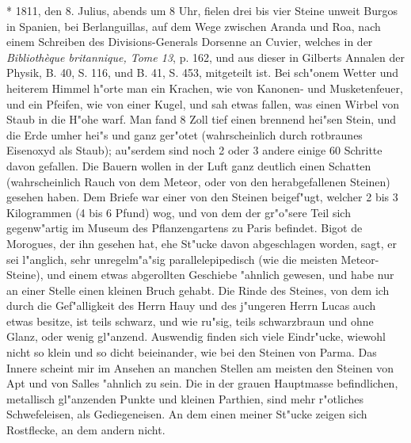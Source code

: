 \documentclass[a4paper, 11pt, oneside, polutonikogreek, german]{article}
\begin{document}
* 1811, den 8. Julius, abends um 8 Uhr, fielen drei bis vier Steine unweit Burgos in Spanien, bei Berlanguillas, auf dem Wege zwischen Aranda und Roa, nach einem Schreiben des Divisions-Generals Dorsenne an Cuvier, welches in der \emph{Bibliothèque britannique, Tome 13}, p. 162, und aus dieser in Gilberts Annalen der Physik, B. 40, S. 116, und B. 41, S. 453, mitgeteilt ist. Bei sch"onem Wetter und heiterem Himmel h"orte man ein Krachen, wie von Kanonen- und Musketenfeuer, und ein Pfeifen, wie von einer Kugel, und sah etwas fallen, was einen Wirbel von Staub in die H"ohe warf. Man fand 8 Zoll tief einen brennend hei"sen Stein, und die Erde umher hei"s und ganz ger"otet (wahrscheinlich durch rotbraunes Eisenoxyd als Staub); au"serdem sind noch 2 oder 3 andere einige 60 Schritte davon gefallen. Die Bauern wollen in der Luft ganz deutlich einen Schatten (wahrscheinlich Rauch von dem Meteor, oder von den herabgefallenen Steinen) gesehen haben. Dem Briefe war einer von den Steinen beigef"ugt, welcher 2 bis 3 Kilogrammen (4 bis 6 Pfund) wog, und von dem der gr"o"sere Teil sich gegenw"artig im Museum des Pflanzengartens zu Paris befindet. Bigot de Morogues, der ihn gesehen hat, ehe St"ucke davon abgeschlagen worden, sagt, er sei l"anglich, sehr unregelm"a"sig parallelepipedisch (wie die meisten Meteor-Steine), und einem etwas abgerollten Geschiebe "ahnlich gewesen, und habe nur an einer Stelle einen kleinen Bruch gehabt. Die Rinde des Steines, von dem ich durch die Gef"alligkeit des Herrn Hauy und des j"ungeren Herrn Lucas auch etwas besitze, ist teils schwarz, und wie ru"sig, teils schwarzbraun und ohne Glanz, oder wenig gl"anzend. Auswendig finden sich viele Eindr"ucke, wiewohl nicht so klein und so dicht beieinander, wie bei den Steinen von Parma. Das Innere scheint mir im Ansehen an manchen Stellen am meisten den Steinen von Apt und von Salles "ahnlich zu sein. Die in der grauen Hauptmasse befindlichen, metallisch gl"anzenden Punkte und kleinen Parthien, sind mehr r"otliches Schwefeleisen, als Gediegeneisen. An dem einen meiner St"ucke zeigen sich Rostflecke, an dem andern nicht.
\end{document}
